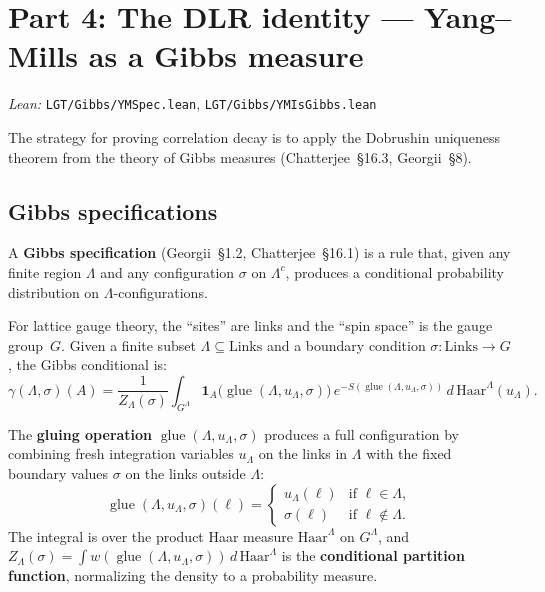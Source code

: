 \documentclass[11pt,a4paper]{article}
\theoremstyle{definition}
\newcommand{\glue}{\operatorname{glue}}
\begin{document}
\section{Part 4: The DLR identity --- Yang--Mills as a Gibbs measure}

\textit{Lean:} \texttt{LGT/Gibbs/YMSpec.lean}, \texttt{LGT/Gibbs/YMIsGibbs.lean}

\medskip

The strategy for proving correlation decay is to apply the
Dobrushin uniqueness theorem from the theory of Gibbs measures
(Chatterjee~\S16.3, Georgii~\S8).

\subsection{Gibbs specifications}

A \textbf{Gibbs specification} (Georgii~\S1.2, Chatterjee~\S16.1)
is a rule that, given any finite region $\Lambda$ and any
configuration $\sigma$ on $\Lambda^c$, produces a conditional
probability distribution on $\Lambda$-configurations.

For lattice gauge theory, the ``sites'' are links and the ``spin
space'' is the gauge group~$G$. Given a finite subset
$\Lambda \subseteq \text{Links}$ and a boundary condition
$\sigma\colon \text{Links} \to G$, the Gibbs conditional is:
\[
  \gamma(\Lambda, \sigma)(A)
  = \frac{1}{Z_\Lambda(\sigma)}
    \int_{G^\Lambda}
    \mathbf{1}_A\bigl(\glue(\Lambda, u_\Lambda, \sigma)\bigr)
    \, e^{-S(\glue(\Lambda, u_\Lambda, \sigma))}
    \, d\,\mathrm{Haar}^\Lambda(u_\Lambda).
\]

The \textbf{gluing operation} $\glue(\Lambda, u_\Lambda, \sigma)$
produces a full configuration by combining fresh integration
variables $u_\Lambda$ on the links in $\Lambda$ with the fixed
boundary values $\sigma$ on the links outside $\Lambda$:
\[
  \glue(\Lambda, u_\Lambda, \sigma)(\ell)
  = \begin{cases}
      u_\Lambda(\ell) & \text{if } \ell \in \Lambda, \\
      \sigma(\ell)    & \text{if } \ell \notin \Lambda.
    \end{cases}
\]
The integral is over the product Haar measure $\mathrm{Haar}^\Lambda$ on
$G^\Lambda$, and
$Z_\Lambda(\sigma) = \int w(\glue(\Lambda, u_\Lambda, \sigma))\,
d\,\mathrm{Haar}^\Lambda$ is the \textbf{conditional partition function},
normalizing the density to a probability measure.
\end{document}
